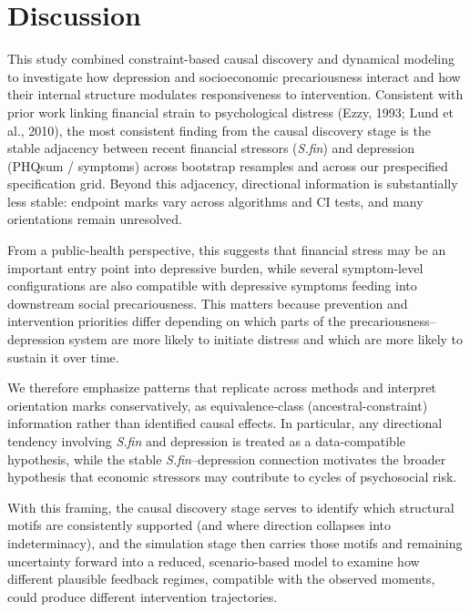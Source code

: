 \documentclass[
]{article}
\begin{document}
\restoregeometry

\section{Discussion}\label{discussion}

This study combined constraint-based causal discovery and dynamical
modeling to investigate how depression and socioeconomic precariousness
interact and how their internal structure modulates responsiveness to
intervention. Consistent with prior work linking financial strain to
psychological distress (Ezzy, 1993; Lund et al., 2010), the most
consistent finding from the causal discovery stage is the stable
adjacency between recent financial stressors (\textit{S.fin}) and
depression (PHQsum / symptoms) across bootstrap resamples and across our
prespecified specification grid. Beyond this adjacency, directional
information is substantially less stable: endpoint marks vary across
algorithms and CI tests, and many orientations remain unresolved.

From a public-health perspective, this suggests that financial stress
may be an important entry point into depressive burden, while several
symptom-level configurations are also compatible with depressive
symptoms feeding into downstream social precariousness. This matters
because prevention and intervention priorities differ depending on which
parts of the precariousness--depression system are more likely to
initiate distress and which are more likely to sustain it over time.

We therefore emphasize patterns that replicate across methods and
interpret orientation marks conservatively, as equivalence-class
(ancestral-constraint) information rather than identified causal
effects. In particular, any directional tendency involving
\textit{S.fin} and depression is treated as a data-compatible
hypothesis, while the stable \textit{S.fin}--depression connection
motivates the broader hypothesis that economic stressors may contribute
to cycles of psychosocial risk.

With this framing, the causal discovery stage serves to identify which
structural motifs are consistently supported (and where direction
collapses into indeterminacy), and the simulation stage then carries
those motifs and remaining uncertainty forward into a reduced,
scenario-based model to examine how different plausible feedback
regimes, compatible with the observed moments, could produce different
intervention trajectories.
\end{document}
